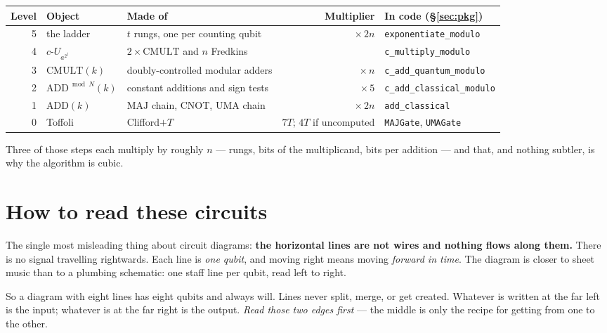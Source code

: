 \documentclass[11pt]{article}
\newcommand{\MAJ}{\mathrm{MAJ}}
\newcommand{\UMA}{\mathrm{UMA}}
\newcommand{\ADD}{\mathrm{ADD}}
\newcommand{\CMULT}{\mathrm{CMULT}}
\newcommand{\code}[1]{\texttt{#1}}
\theoremstyle{plain}
\theoremstyle{remark}
\begin{document}
\begin{center}\small\setlength{\tabcolsep}{4pt}
\begin{tabular}{@{}rllrl@{}}
\toprule
Level & Object & Made of & Multiplier & In code (\S\ref{sec:pkg})\\
\midrule
5 & the ladder & $t$ rungs, one per counting qubit & $\times\,2n$ & \code{exponentiate\_modulo}\\
4 & $c\text{-}U_{a^{2^j}}$ & $2\times\CMULT$ and $n$ Fredkins & & \code{c\_multiply\_modulo}\\
3 & $\CMULT(k)$ & doubly-controlled modular adders & $\times\,n$ & \code{c\_add\_quantum\_modulo}\\
2 & $\ADD^{\bmod N}(k)$ & constant additions and sign tests & $\times\,5$ & \code{c\_add\_classical\_modulo}\\
1 & $\ADD(k)$ & $\MAJ$ chain, CNOT, $\UMA$ chain & $\times\,2n$ & \code{add\_classical}\\
0 & Toffoli & Clifford$+T$ & $7T$; $4T$ if uncomputed & \code{MAJGate}, \code{UMAGate}\\
\bottomrule
\end{tabular}
\end{center}

\noindent
Three of those steps each multiply by roughly $n$ --- rungs, bits of the multiplicand, bits per
addition --- and that, and nothing subtler, is why the algorithm is cubic.

\section{How to read these circuits}

The single most misleading thing about circuit diagrams: \textbf{the horizontal lines are not wires
and nothing flows along them.} There is no signal travelling rightwards. Each line is \emph{one
qubit}, and moving right means moving \emph{forward in time}. The diagram is closer to sheet music
than to a plumbing schematic: one staff line per qubit, read left to right.

So a diagram with eight lines has eight qubits and always will. Lines never split, merge, or get
created. Whatever is written at the far left is the input; whatever is at the far right is the
output. \emph{Read those two edges first} --- the middle is only the recipe for getting from one to
the other.
\end{document}

